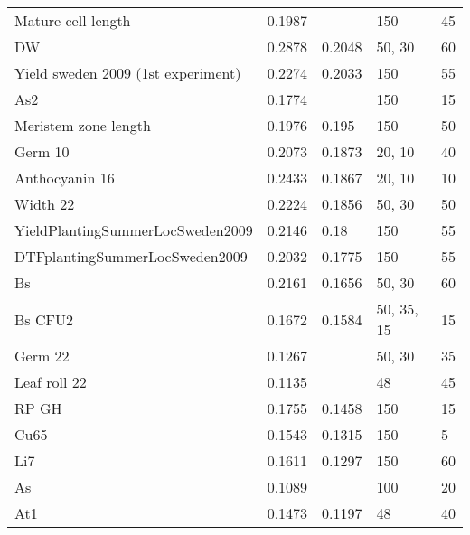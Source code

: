 \begin{longtable}{p{} p{} p{} p{} p{}}
  Mature cell length                 & 0.1987  & \color{red}{0.2052}  & 150          & 45     \\
  DW                                 & 0.2878  & 0.2048               & 50, 30       & 60     \\
  Yield sweden 2009 (1st experiment) & 0.2274  & 0.2033               & 150          & 55     \\
  As2                                & 0.1774  & \color{red}{0.1962}  & 150          & 15     \\
  Meristem zone length               & 0.1976  & 0.195                & 150          & 50     \\
  Germ 10                            & 0.2073  & 0.1873               & 20, 10       & 40     \\
  Anthocyanin 16                     & 0.2433  & 0.1867               & 20, 10       & 10     \\
  Width 22                           & 0.2224  & 0.1856               & 50, 30       & 50     \\
  YieldPlantingSummerLocSweden2009   & 0.2146  & 0.18                 & 150          & 55     \\
  DTFplantingSummerLocSweden2009     & 0.2032  & 0.1775               & 150          & 55     \\
  Bs                                 & 0.2161  & 0.1656               & 50, 30       & 60     \\
  Bs CFU2                            & 0.1672  & 0.1584               & 50, 35, 15   & 15     \\
  Germ 22                            & 0.1267  & \color{red}{0.1533}  & 50, 30       & 35     \\
  Leaf roll 22                       & 0.1135  & \color{red}{0.1511}  & 48           & 45     \\
  RP GH                              & 0.1755  & 0.1458               & 150          & 15     \\
  Cu65                               & 0.1543  & 0.1315               & 150          & 5      \\
  Li7                                & 0.1611  & 0.1297               & 150          & 60     \\
  As                                 & 0.1089  & \color{red}{0.1227}  & 100          & 20     \\
  At1                                & 0.1473  & 0.1197               & 48           & 40     \\

\end{longtable}
